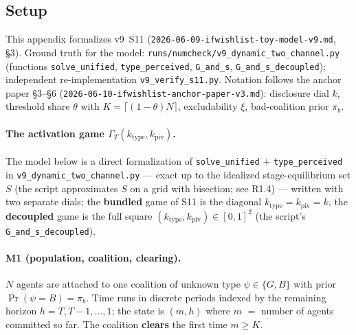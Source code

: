 %

\subsection*{Setup}

This appendix formalizes v9~S11 (\texttt{2026-06-09-ifwishlist-toy-model-v9.md}, \S3).
Ground truth for the model: \texttt{runs/numcheck/v9\_dynamic\_two\_channel.py} (functions
\texttt{solve\_unified}, \texttt{type\_perceived}, \texttt{G\_and\_s},
\texttt{G\_and\_s\_decoupled}); independent re-implementation \texttt{v9\_verify\_s11.py}.
Notation follows the anchor paper \S3--\S6 (\texttt{2026-06-10-ifwishlist-anchor-paper-v3.md}):
disclosure dial $k$, threshold share $\theta$ with $K=\lceil(1-\theta)N\rceil$, excludability
$\xi$, bad-coalition prior $\pi_b$.

\paragraph{The activation game $\Gamma_T(k_{\mathrm{type}},k_{\mathrm{piv}})$.}
The model below is a direct formalization of \texttt{solve\_unified} $+$
\texttt{type\_perceived} in \texttt{v9\_dynamic\_two\_channel.py} --- exact up to the idealized
stage-equilibrium set $S$ (the script approximates $S$ on a grid with bisection; see R1.4) ---
written with two separate dials; the \textbf{bundled} game of S11 is the diagonal
$k_{\mathrm{type}}=k_{\mathrm{piv}}=k$, the \textbf{decoupled} game is the full square
$(k_{\mathrm{type}},k_{\mathrm{piv}})\in[0,1]^2$ (the script's \texttt{G\_and\_s\_decoupled}).

\paragraph{M1 (population, coalition, clearing).}
$N$ agents are attached to one coalition of unknown type $\psi\in\{G,B\}$ with prior
$\Pr(\psi=B)=\pi_b$. Time runs in discrete periods indexed by the remaining horizon
$h=T,T-1,\dots,1$; the state is $(m,h)$ where $m$ $=$ number of agents committed so far. The
coalition \textbf{clears} the first time $m\ge K$.

